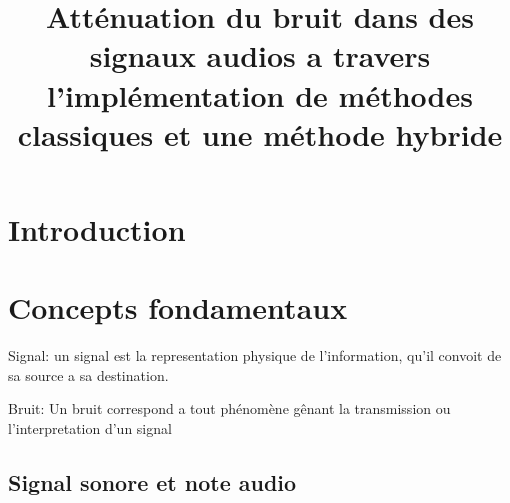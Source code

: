 \documentclass[conference,onecolumn]{IEEEtran}
\begin{document}
\title{Atténuation du bruit dans des signaux audios a travers l’implémentation de méthodes classiques et une méthode hybride\\
}

\author{
\and
{}
\and
{}
}

\maketitle

\begin{abstract}
\end{abstract}

\section{Introduction}

\section{Concepts fondamentaux}
Signal: un signal est la representation physique de l'information, qu'il convoit de sa source a sa destination.

Bruit: Un bruit correspond a tout phénomène gênant la transmission ou l'interpretation d'un signal


\subsection{Signal sonore et note audio}
\end{document}
